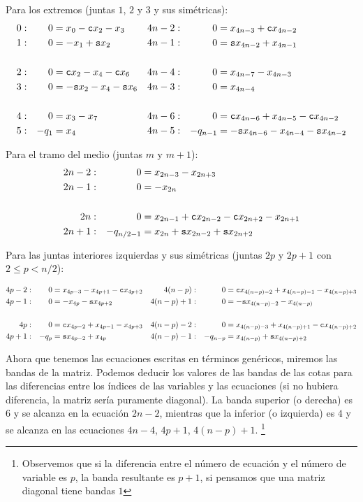 Para los extremos (juntas $1$, $2$ y $3$ y sus simétricas):
\begin{align*}
	0:& & 0 &= x_0 - \mathtt{c} x_2 - x_3   & 4n-2: & & 0 &=   x_{4n-3}+ \mathtt{c} x_{4n-2} \\
	1:& & 0 &= - x_1 + \mathtt{s} x_2   & 4n-1: & & 0 &= \mathtt{s} x_{4n-2}  + x_{4n-1} \\
	\\
	2: & & 0 &=  \mathtt{c} x_2 - x_4 - \mathtt{c} x_6  &  4n-4: & &0 &= x_{4n-7} - x_{4n-3} \\
	3: & & 0 &= - \mathtt{s} x_2 -  x_4 - \mathtt{s} x_6 & 4n-3: & & 0 &= x_{4n-4}   \\
	\\
	4: & & 0 &=  x_3 - x_7  & 4n-6: && 0&=  \mathtt{c} x_{4n-6} + x_{4n-5} - \mathtt{c} x_{4n-2}\\
	5: & & -q_1 &= x_4 &  4n-5: && -q_{n-1} &= -\mathtt{s} x_{4n-6} - x_{4n-4} - \mathtt{s} x_{4n-2}
\end{align*}

Para el tramo del medio (juntas $m$ y $m+1$):
\begin{align*}
2n-2:& & 0 &= x_{2n-3} - x_{2n+3}  \\
2n-1:& & 0 &= -x_{2n}  \\
\\
2n: & & 0 &= x_{2n-1} + \mathtt{c} x_{2n-2} - \mathtt{c} x_{2n+2} - x_{2n+1}   \\
2n+1: & & -q_{n/2 -1} &= x_{2n} + \mathtt{s} x_{2n-2} + \mathtt{s} x_{2n+2}   
\end{align*}

Para las juntas interiores izquierdas y sus simétricas (juntas $2p$ y $2p+1$ con $2 \leq p < n/2$):

\begin{align*}
4p-2: & & 0 &=x_{4p-3} - x_{4p+1} - \mathtt{c} x_{4p+2} & 4(n-p): & & 0 &= \mathtt{c} x_{4(n-p)-2} + x_{4(n-p)-1} -  x_{4(n-p)+3}\\
4p-1: & &0 &= -x_{4p} - \mathtt{s} x_{4p+2} & 4(n-p)+1: & & 0 &= -\mathtt{s} x_{4(n-p)-2} - x_{4(n-p)} \\
\\
4p: & & 0 &= \mathtt{c} x_{4p-2}  + x_{4p-1} - x_{4p+3}  & 4(n-p)-2: & & 0 &= x_{4(n-p)-3} + x_{4(n-p)+1} - \mathtt{c} x_{4(n-p)+2} \\
4p+1: & &-q_{p} &= \mathtt{s} x_{4p-2} +x_{4p} & 4(n-p)-1: & & -q_{n-p} &= x_{4(n-p)} + \mathtt{s} x_{4(n-p)+2} \\
\end{align*}

Ahora que tenemos las ecuaciones escritas en términos genéricos, miremos las bandas de la matriz. Podemos deducir los valores de las bandas de las cotas para las diferencias entre los índices de las variables y las ecuaciones (si no hubiera diferencia, la matriz sería puramente diagonal). La banda superior (o derecha) es $6$ y se alcanza en la ecuación $2n-2$, mientras que la inferior (o izquierda) es $4$ y se alcanza en las ecuaciones $4n-4$, $4p+1$, $4(n-p)+1$. \footnote{Observemos que si la diferencia entre el número de ecuación y el número de variable es $p$, la banda resultante es $p+1$, si pensamos que una matriz diagonal tiene bandas $1$}



